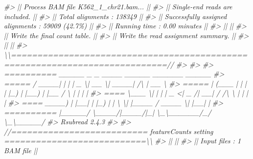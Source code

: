 \documentclass[
]{article}
\newenvironment{Shaded}{\begin{snugshade}}{\end{snugshade}}
\newcommand{\CommentTok}[1]{\textcolor[rgb]{0.56,0.35,0.01}{\textit{#1}}}
\begin{document}
\begin{Shaded}
\begin{Highlighting}[]
\CommentTok{\#\textgreater{} || Process BAM file K562\_1\_chr21.bam...                                       ||}
\CommentTok{\#\textgreater{} ||    Single{-}end reads are included.                                          ||}
\CommentTok{\#\textgreater{} ||    Total alignments : 138349                                               ||}
\CommentTok{\#\textgreater{} ||    Successfully assigned alignments : 59009 (42.7\%)                        ||}
\CommentTok{\#\textgreater{} ||    Running time : 0.00 minutes                                             ||}
\CommentTok{\#\textgreater{} ||                                                                            ||}
\CommentTok{\#\textgreater{} || Write the final count table.                                               ||}
\CommentTok{\#\textgreater{} || Write the read assignment summary.                                         ||}
\CommentTok{\#\textgreater{} ||                                                                            ||}
\CommentTok{\#\textgreater{} \textbackslash{}\textbackslash{}============================================================================//}
\CommentTok{\#\textgreater{} }
\CommentTok{\#\textgreater{} }
\CommentTok{\#\textgreater{}         ==========     \_\_\_\_\_ \_    \_ \_\_\_\_  \_\_\_\_\_  \_\_\_\_\_\_          \_\_\_\_\_  }
\CommentTok{\#\textgreater{}         =====         / \_\_\_\_| |  | |  \_ \textbackslash{}|  \_\_ \textbackslash{}|  \_\_\_\_|   /\textbackslash{}   |  \_\_ \textbackslash{} }
\CommentTok{\#\textgreater{}           =====      | (\_\_\_ | |  | | |\_) | |\_\_) | |\_\_     /  \textbackslash{}  | |  | |}
\CommentTok{\#\textgreater{}             ====      \textbackslash{}\_\_\_ \textbackslash{}| |  | |  \_ \textless{}|  \_  /|  \_\_|   / /\textbackslash{} \textbackslash{} | |  | |}
\CommentTok{\#\textgreater{}               ====    \_\_\_\_) | |\_\_| | |\_) | | \textbackslash{} \textbackslash{}| |\_\_\_\_ / \_\_\_\_ \textbackslash{}| |\_\_| |}
\CommentTok{\#\textgreater{}         ==========   |\_\_\_\_\_/ \textbackslash{}\_\_\_\_/|\_\_\_\_/|\_|  \textbackslash{}\_\textbackslash{}\_\_\_\_\_\_/\_/    \textbackslash{}\_\textbackslash{}\_\_\_\_\_/}
\CommentTok{\#\textgreater{}        Rsubread 2.4.3}
\CommentTok{\#\textgreater{} }
\CommentTok{\#\textgreater{} //========================== featureCounts setting ===========================\textbackslash{}\textbackslash{}}
\CommentTok{\#\textgreater{} ||                                                                            ||}
\CommentTok{\#\textgreater{} ||             Input files : 1 BAM file                                       ||}

\end{Highlighting}
\end{Shaded}
\end{document}
